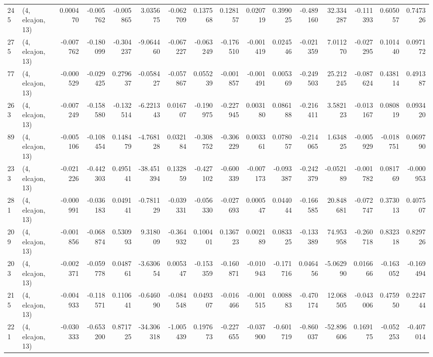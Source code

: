 \begin{tabular}{llrrrrrrrrrrrrrr}
245 &  (4, elcajon, 13) &   0.000470 & -0.005762 & -0.005865 &   3.035675 & -0.062709 &   0.137568 &  0.128157 &  0.020719 &  0.399025 & -0.489160 &    32.334287 &  -0.111393 &   0.605057 &   0.747326 \\
275 &  (4, elcajon, 13) &  -0.007762 & -0.180099 & -0.304237 &  -9.064460 & -0.067227 &  -0.063249 & -0.176510 & -0.001419 &  0.024546 & -0.021359 &     7.011270 &  -0.027295 &   0.101440 &   0.097172 \\
77  &  (4, elcajon, 13) &  -0.000529 & -0.029425 &  0.279637 &  -0.058427 & -0.057867 &   0.055239 & -0.001857 & -0.001491 &  0.005369 & -0.249503 &    25.212245 &  -0.087624 &   0.438114 &   0.491387 \\
263 &  (4, elcajon, 13) &  -0.007249 & -0.158580 & -0.132514 &  -6.221343 &  0.016707 &  -0.190975 & -0.227945 &  0.003180 &  0.086188 & -0.216411 &     3.582123 &  -0.013167 &   0.080819 &   0.093420 \\
89  &  (4, elcajon, 13) &  -0.005106 & -0.108454 &  0.148479 &  -4.768128 &  0.032184 &  -0.308752 & -0.306229 &  0.003361 &  0.078057 & -0.214065 &     1.634825 &  -0.005929 &  -0.018751 &   0.069790 \\
233 &  (4, elcajon, 13) &  -0.021226 & -0.442303 &  0.495141 & -38.451394 &  0.132859 &  -0.427102 & -0.600339 & -0.007173 & -0.093387 & -0.242379 &    -0.052189 &  -0.001782 &   0.081769 &  -0.000953 \\
281 &  (4, elcajon, 13) &  -0.000991 & -0.036183 &  0.049141 &  -0.781129 & -0.039331 &  -0.056330 & -0.027693 &  0.000547 &  0.044044 & -0.166585 &    20.848681 &  -0.072747 &   0.373013 &   0.407507 \\
209 &  (4, elcajon, 13) &  -0.001856 & -0.068874 &  0.530993 &   9.318009 & -0.364932 &   0.100401 &  0.136723 &  0.002189 &  0.083325 & -0.133389 &    74.953958 &  -0.260718 &   0.832318 &   0.829726 \\
203 &  (4, elcajon, 13) &  -0.002371 & -0.059778 &  0.048761 &  -3.630654 &  0.005347 &  -0.153359 & -0.160871 & -0.010943 & -0.171716 &  0.046456 &    -5.062990 &   0.016666 &  -0.163052 &  -0.169494 \\
215 &  (4, elcajon, 13) &  -0.004933 & -0.118571 &  0.110641 &  -0.646090 & -0.084548 &   0.049307 & -0.016466 & -0.001515 &  0.008883 & -0.470174 &    12.068505 &  -0.043006 &   0.475950 &   0.224744 \\
221 &  (4, elcajon, 13) &  -0.030333 & -0.653200 &  0.871725 & -34.306318 & -1.005439 &   0.197673 & -0.227655 & -0.037900 & -0.601719 & -0.860037 &   -52.896606 &   0.169175 &  -0.052253 &  -0.407014 \\

\end{tabular}
